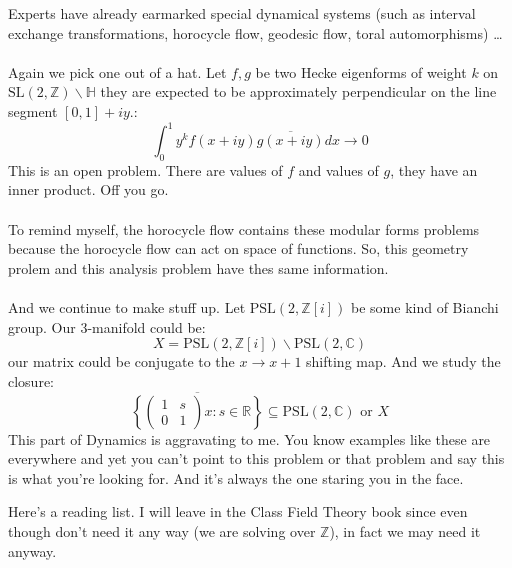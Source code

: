 \documentclass[12pt]{article}
\begin{document}
\noindent Experts have already earmarked special dynamical systems (such as interval exchange transformations, horocycle flow, geodesic flow, toral automorphisms)  \dots \\ \\
Again we pick one out of a hat.  Let $f, g$ be two Hecke eigenforms of weight $k$ on $ \mathrm{SL}(2, \mathbb{Z}) \backslash \mathbb{H}$ they are expected to be approximately perpendicular on the line segment $[0,1] + iy$.:
$$ \int_0^1 y^k f(x+iy)\overline{g(x+iy)} dx \to 0 $$
This is an open problem.  There are values of $f$ and values of $g$, they have an inner product.  Off you go. \\\\
To remind myself, the horocycle flow contains these modular forms problems because the horocycle flow can act on space of functions.  So, this geometry prolem and this analysis problem have thes same information. \\ \\
And we continue to make stuff up.  Let $\mathrm{PSL}(2, \mathbb{Z}[i])$ be some kind of Bianchi group.  Our 3-manifold could be:
$$ X = \mathrm{PSL}(2, \mathbb{Z}[i]) \backslash \mathrm{PSL}(2, \mathbb{C})$$
our matrix could be conjugate to the $x \to x+1$ shifting map. And we study the closure:
$$ \overline{ \left\{ \left( \begin{array}{cc} 1 & s \\ 0 & 1\end{array} \right)x : s \in \mathbb{R} \right\}  }   \subseteq \mathrm{PSL}(2, \mathbb{C}) \text{ or }X $$
This part of Dynamics is aggravating to me.  You know examples like these are everywhere and yet you can't point to this problem or that problem and say this is what you're looking for.  And it's always the one staring you in the face.
 
\newpage
 
\vfill


\noindent Here's a reading list. I will leave in the Class Field Theory book since even though don't need it any way (we are solving over $\mathbb{Z}$), in fact we may need it anyway.
\end{document}
